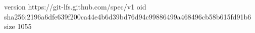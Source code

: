 version https://git-lfs.github.com/spec/v1
oid sha256:2196a6dfe639f200ca44e4b6d39bd76d94c99886499a468496cb58b615fd91b6
size 1055
